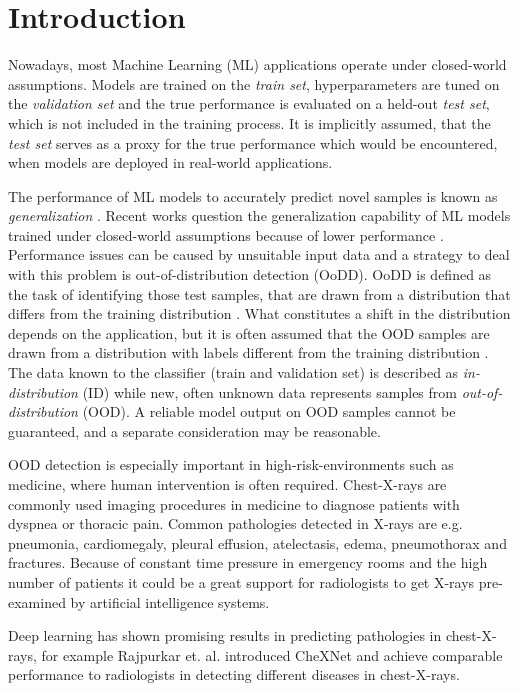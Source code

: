 \section{Introduction}
\raggedbottom
Nowadays, most Machine Learning (ML) applications operate under closed-world assumptions.
Models are trained on the \textit{train set}, hyperparameters are tuned on the \textit{validation set} and the true performance is evaluated on a held-out \textit{test set}, which is not included in the training process.
It is implicitly assumed, that the \textit{test set} serves as a proxy for the true performance which would be encountered, when models are deployed in real-world applications.
\par
The performance of ML models to accurately predict novel samples is known as \textit{generalization} \citep{Bishop2006}.
Recent works question the generalization capability of ML models trained under closed-world assumptions because of lower performance \citep{Recht2018,Zech2018}.
Performance issues can be caused by unsuitable input data and a strategy to deal with this problem is out-of-distribution detection (OoDD).
OoDD is defined as the task of identifying those test samples, that are drawn from a distribution that differs from the training distribution \citep{Yang2021}.
What constitutes a shift in the distribution depends on the application, but it is often assumed that the OOD samples are drawn from a distribution with labels different from the training distribution \citep{Yang2021}.
The data known to the classifier (train and validation set) is described as \textit{in-distribution} (ID) while new, often unknown data represents samples from \textit{out-of-distribution} (OOD).
A reliable model output on OOD samples cannot be guaranteed, and a separate consideration may be reasonable.
\par
OOD detection is especially important in high-risk-environments such as medicine, where human intervention is often required.
Chest-X-rays are commonly used imaging procedures in medicine to diagnose patients with dyspnea or thoracic pain.
Common pathologies detected in X-rays are e.g. pneumonia, cardiomegaly, pleural effusion, atelectasis, edema, pneumothorax and fractures. 
Because of constant time pressure in emergency rooms and the high number of patients it could be a great support for radiologists to get X-rays pre-examined by artificial intelligence systems.
\par
Deep learning has shown promising results in predicting pathologies in chest-X-rays, for example Rajpurkar et. al. \citep{Rajpurkar2017} introduced CheXNet and achieve comparable performance to radiologists in detecting different diseases in chest-X-rays.
